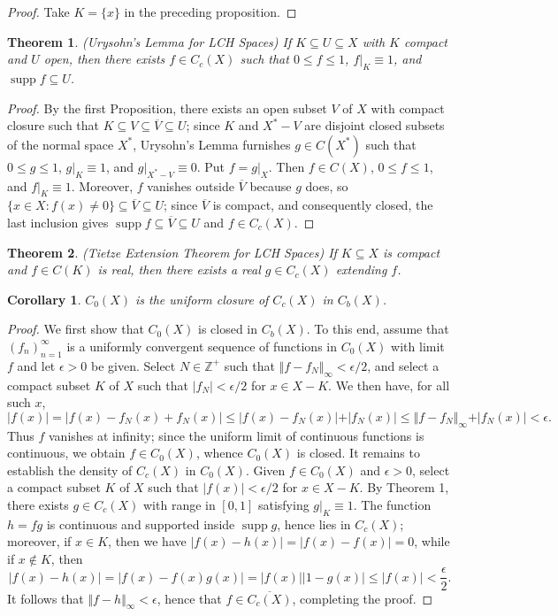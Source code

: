 \documentclass[12pt]{article}
\theoremstyle{plain}
\newtheorem{thm}{Theorem}
\newtheorem{cor}{Corollary}
\newcommand{\set}[1]{\{#1\}}
\newcommand{\abs}[1]{\vert#1\vert}
\newcommand{\norm}[1]{\Vert#1\Vert}
\DeclareMathOperator{\supp}{supp}
\begin{document}
\begin{proof}
Take $K=\set{x}$ in the preceding proposition. 
\end{proof}
\begin{thm}
(Urysohn's Lemma for LCH Spaces)
If $K\subseteq U\subseteq X$ with $K$ compact and $U$ open, then there exists $f\in C_c(X)$ such that $0\leq f\leq 1$, $f\vert_K\equiv 1$, and $\supp f\subseteq U$.
\end{thm}
\begin{proof}
By the first Proposition, there exists an open subset $V$ of $X$ with compact closure such that $K\subseteq V\subseteq\overline{V}\subseteq U$; since $K$ and $X^*-V$ are disjoint closed subsets of the normal space $X^*$, Urysohn's Lemma furnishes $g\in C(X^*)$ such that $0\leq g\leq 1$, $g\vert_K\equiv 1$, and $g\vert_{X^*-V}\equiv 0$. Put $f=g\vert_X$. Then $f\in C(X)$, $0\leq f\leq 1$, and $f\vert_K\equiv 1$. Moreover, $f$ vanishes outside $\overline{V}$ because $g$ does, so $\set{x\in X:f(x)\neq 0}\subseteq\overline{V}\subseteq U$; since $\overline{V}$ is compact, and consequently closed, the last inclusion gives $\supp f\subseteq\overline{V}\subseteq U$ and $f\in C_c(X)$.
\end{proof}
\begin{thm}
(Tietze Extension Theorem for LCH Spaces)
If $K\subseteq X$ is compact and $f\in C(K)$ is real, then there exists a real $g\in C_c(X)$ extending $f$.
\end{thm}
\begin{cor}
$C_0(X)$ is the uniform closure of $C_c(X)$ in $C_b(X)$.
\end{cor}
\begin{proof}
We first show that $C_0(X)$ is closed in $C_b(X)$. To this end, assume that $(f_n)_{n=1}^\infty$ is a uniformly convergent sequence of functions in $C_0(X)$ with limit $f$ and let $\epsilon>0$ be given. Select $N\in\mathbb{Z}^+$ such that $\norm{f-f_N}_\infty<\epsilon/2$, and select a compact subset $K$ of $X$ such that $\abs{f_N}<\epsilon/2$ for $x\in X-K$. We then have, for all such $x$,
\begin{equation*}
\abs{f(x)}=\abs{f(x)-f_N(x)+f_N(x)}\leq\abs{f(x)-f_N(x)}+\abs{f_N(x)}\leq\norm{f-f_N}_\infty+\abs{f_N(x)}<
\epsilon\text{.}
\end{equation*}
Thus $f$ vanishes at infinity; since the uniform limit of continuous functions is continuous, we obtain $f\in C_0(X)$, whence $C_0(X)$ is closed. It remains to establish the density of $C_c(X)$ in $C_0(X)$. Given $f\in C_0(X)$ and $\epsilon>0$, select a compact subset $K$ of $X$ such that $\abs{f(x)}<\epsilon/2$ for $x\in X-K$. By Theorem 1, there exists $g\in C_c(X)$ with range in $[0,1]$ satisfying $g\vert_K\equiv 1$. The function $h=fg$ is continuous and supported inside $\supp g$, hence lies in $C_c(X)$; moreover, if $x\in K$, then we have $\abs{f(x)-h(x)}=\abs{f(x)-f(x)}=0$, while if $x\notin K$, then
\begin{equation*}
\abs{f(x)-h(x)}=\abs{f(x)-f(x)g(x)}=\abs{f(x)}\abs{1-g(x)}\leq\abs{f(x)}<\dfrac{\epsilon}{2}\text{.}
\end{equation*}
It follows that $\norm{f-h}_\infty<\epsilon$, hence that $f\in\overline{C_c(X)}$, completing the proof.
\end{proof}

\end{document}
